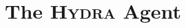 \documentclass[sigconf]{aamas}
\newcommand{\sbirds}{Science Birds\xspace} %
\newcommand{\hydra}{\textsc{Hydra}\xspace} %
\begin{document}






\section{The \hydra Agent}

\end{document}
